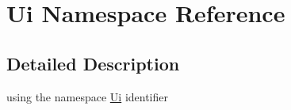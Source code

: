 \hypertarget{namespace_ui}{\section{Ui Namespace Reference}
\label{namespace_ui}
}


\subsection{Detailed Description}
using the namespace \hyperlink{namespace_ui}{Ui} identifier 